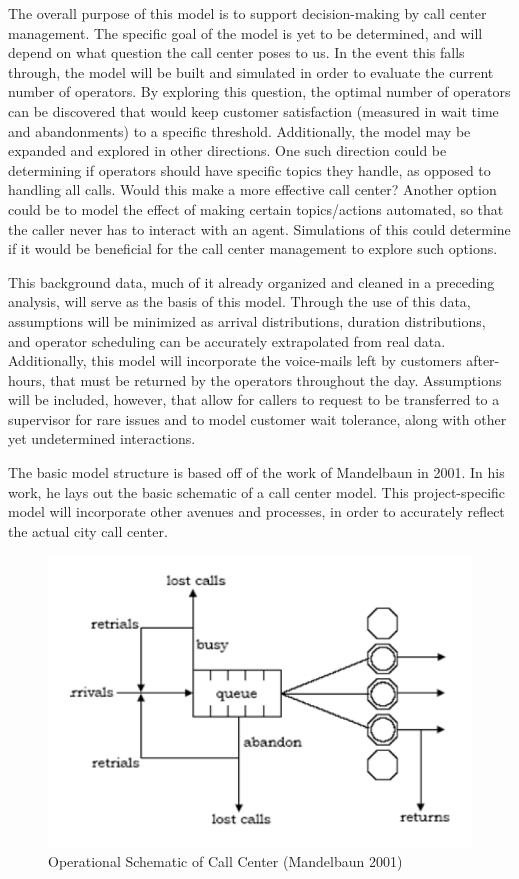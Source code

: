 \documentclass[11pt,twocolumn]{article}
\begin{document}
\par
The overall purpose of this model is to support decision-making by call center management.  The specific goal of the model is yet to be determined, and will depend on what question the call center poses to us.  In the event this falls through, the model will be built and simulated in order to evaluate the current number of operators.  By exploring this question, the optimal number of operators can be discovered that would keep customer satisfaction (measured in wait time and abandonments) to a specific threshold.  Additionally, the model may be expanded and explored in other directions. One such direction could be determining if operators should have specific topics they handle, as opposed to handling all calls.  Would this make a more effective call center?  Another option could be to model the effect of making certain topics/actions automated, so that the caller never has to interact with an agent.  Simulations of this could determine if it would be beneficial for the call center management to explore such options.
\par
This background data, much of it already organized and cleaned in a preceding analysis, will serve as the basis of this model.  Through the use of this data, assumptions will be minimized as arrival distributions, duration distributions, and operator scheduling can be accurately extrapolated from real data.  Additionally, this model will incorporate the voice-mails left by customers after-hours, that must be returned by the operators throughout the day.  Assumptions will be included, however, that allow for callers to request to be transferred to a supervisor for rare issues and to model customer wait tolerance, along with other yet undetermined interactions.
\par
The basic model structure is based off of the work of Mandelbaun in 2001.  In his work, he lays out the basic schematic of a call center model.\cite{mandelbaun}  This project-specific model will incorporate other avenues and processes, in order to accurately reflect the actual city call center.

\begin{figure}[h]
	\includegraphics[scale=.45]{call_center_layout.png}
	\caption{Operational Schematic of Call Center (Mandelbaun 2001)}
\end{figure}
\end{document}
